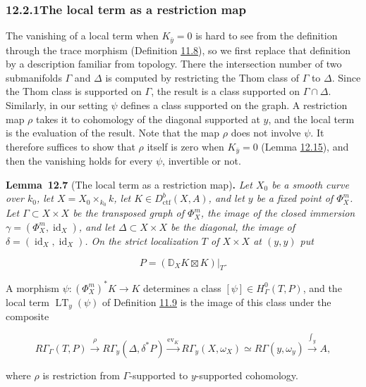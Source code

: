 \documentclass[11pt]{article}
\newenvironment{bpstatement}[2]{\par\addvspace{0.6\baselineskip}\noindent\textbf{#1}#2\textbf{.}\enspace\ignorespaces}
  {\par\addvspace{0.4\baselineskip}}
\newenvironment{bpstatementit}[2]{\begin{bpstatement}{#1}{#2}\itshape\ignorespaces}{\end{bpstatement}}
\begin{document}
\subsubsection*{\texorpdfstring{12.2.1\quad The local term as a restriction map}{12.2.1 The local term as a restriction map}}
\label{bp244}%
\label{bp245}%
The vanishing of a local term when \(K_{\bar y}=0\) is hard to see from the definition through the trace morphism (Definition \hyperref[bp194]{11.8}), so we first replace that definition by a description familiar from topology. There the intersection number of two submanifolds \(\Gamma\) and \(\Delta\) is computed by restricting the Thom class of \(\Gamma\) to \(\Delta\). Since the Thom class is supported on \(\Gamma\), the result is a class supported on \(\Gamma\cap\Delta\). Similarly, in our setting \(\psi\) defines a class supported on the graph. A restriction map \(\rho\) takes it to cohomology of the diagonal supported at \(y\), and the local term is the evaluation of the result. Note that the map \(\rho\) does not involve \(\psi\). It therefore suffices to show that \(\rho\) itself is zero when \(K_{\bar y}=0\) (Lemma \hyperref[bp270]{12.15}), and then the vanishing holds for every \(\psi\), invertible or not.

\label{bp246}%
\begin{bpstatementit}{Lemma~12.7}{ (The local term as a restriction map)}
Let \(X_0\) be a smooth curve over \(k_0\), let \(X=X_0\times_{k_0}k\), let \(K\in D^b_{\mathrm{ctf}}(X,A)\), and let \(y\) be a fixed point of \(\Phi_X^m\). Let \(\Gamma\subset X\times X\) be the transposed graph of \(\Phi_X^m\), the image of the closed immersion \(\gamma=(\Phi_X^m,\operatorname{id}_X)\), and let \(\Delta\subset X\times X\) be the diagonal, the image of \(\delta=(\operatorname{id}_X,\operatorname{id}_X)\). On the strict localization \(T\) of \(X\times X\) at \((y,y)\) put

\[
P=(\mathbb D_XK\boxtimes K)|_T.
\]

A morphism \(\psi:(\Phi_X^m)^*K\to K\) determines a class \([\psi]\in H^0_\Gamma(T,P)\), and the local term \(\operatorname{LT}_y(\psi)\) of Definition \hyperref[bp197]{11.9} is the image of this class under the composite

\[
R\Gamma_\Gamma(T,P)
\xrightarrow{\rho}
R\Gamma_y(\Delta,\delta^*P)
\xrightarrow{\mathrm{ev}_K}
R\Gamma_y(X,\omega_X)
\simeq R\Gamma(y,\omega_y)
\xrightarrow{\int_y} A,
\]

where \(\rho\) is restriction from \(\Gamma\)-supported to \(y\)-supported cohomology.
\end{bpstatementit}
\end{document}
